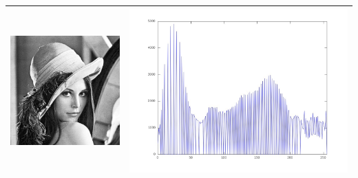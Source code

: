 \documentclass[brazil,times]{abnt}
\begin{document}
\begin{table}[ht]
\begin{tabular}{|c|c|}
			\hline
			\includegraphics[scale=0.25]{imagens/lena-contrast.jpg}&\includegraphics[scale=0.15]{imagens/lena-hist-novo.jpg}\\
			\hline

\end{tabular}
\end{table}
\end{document}
